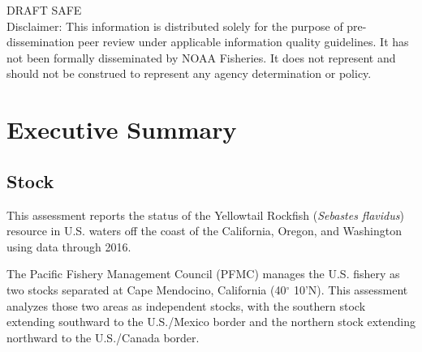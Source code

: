 \documentclass[12pt,]{article}
\begin{document}
\begin{center}
\vfill
DRAFT SAFE\\
Disclaimer: This information is distributed solely for the purpose of pre-dissemination
peer review under applicable information quality guidelines. It has not been formally
disseminated by NOAA Fisheries. It does not represent and should not be construed to
represent any agency determination or policy. 

\vspace{.3cm}

\maketitle

\setcounter{page}{1}
\end{center}

{
\setcounter{tocdepth}{4}
\tableofcontents
}
\setlength{\parskip}{5mm plus1mm minus1mm} \pagebreak

 \setcounter{page}{1}
\renewcommand{\thefigure}{\alph{figure}}
\renewcommand{\thetable}{\alph{table}}

\section{}\label{section}

\section*{Executive Summary}\label{executive-summary}

\subsection*{Stock}\label{stock}

This assessment reports the status of the Yellowtail Rockfish
(\emph{Sebastes flavidus}) resource in U.S. waters off the coast of the
California, Oregon, and Washington using data through 2016.

The Pacific Fishery Management Council (PFMC) manages the U.S. fishery
as two stocks separated at Cape Mendocino, California (40\(^\circ\)
10'N). This assessment analyzes those two areas as independent stocks,
with the southern stock extending southward to the U.S./Mexico border
and the northern stock extending northward to the U.S./Canada border.
\end{document}
